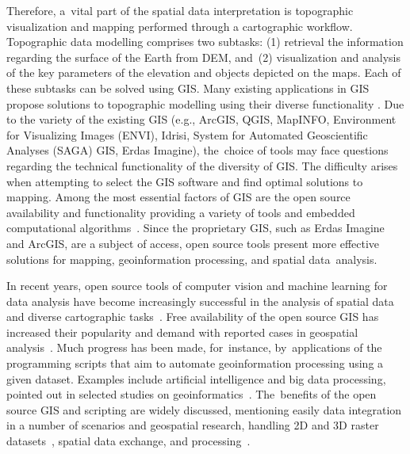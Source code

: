 \documentclass[technologies,article,accept,pdftex,moreauthors]{Definitions/mdpi}
\begin{document}
Therefore, a~vital part of the spatial data interpretation is {topographic }visualization and mapping performed through a cartographic workflow. Topographic data modelling comprises two subtasks: (1) retrieval the information regarding the surface of the Earth from DEM, and~(2) visualization and analysis of the key parameters of the elevation and objects depicted on the maps. Each of these subtasks can be solved using GIS. Many existing applications in GIS {propose solutions to topographic modelling using their diverse functionality} \cite{Boulton,Buterez,Duncan}. Due to the variety of the existing GIS (e.g., ArcGIS, QGIS, MapINFO, Environment for Visualizing Images (ENVI), Idrisi, System for Automated Geoscientific Analyses (SAGA) GIS, Erdas Imagine), the~choice of tools may face{ }questions regarding the {technical} functionality of the {diversity of} GIS. {The difficulty arises when attempting to select the GIS software and find optimal solutions to mapping. }Among the most essential factors of GIS are the open source availability and functionality providing a variety of tools and embedded computational algorithms~\cite{agronomy11050952,Armstrong,ijgi5110209}. Since the {proprietary} GIS, such as Erdas Imagine and ArcGIS, are a subject of access, open source tools present {more }effective solutions for mapping{, geoinformation processing}, and spatial data~analysis. 

In recent years, open source tools of computer vision and machine learning for data analysis have become increasingly successful in {the analysis of} spatial data and {diverse }cartographic tasks~\cite{Brovelli}. Free availability of {the }open source GIS {has increased their } popularity and demand with reported cases in{ }geospatial analysis~\cite{Christl,Turton}. Much progress has been made, for~instance, by~applications of {the }programming scripts that aim to {automate geoinformation }processing using a given dataset. Examples include artificial intelligence and big data processing, pointed out in selected studies on geoinformatics~\cite{Barnes,Issaka}. The~benefits of the open source GIS and scripting are widely discussed, mentioning easily data integration in a number of scenarios and geospatial research, handling 2D and 3D raster datasets~\cite{land12010261}, spatial {data} exchange, and processing~\cite{Ajvazi,Guan,Kralidis}. 
\end{document}
